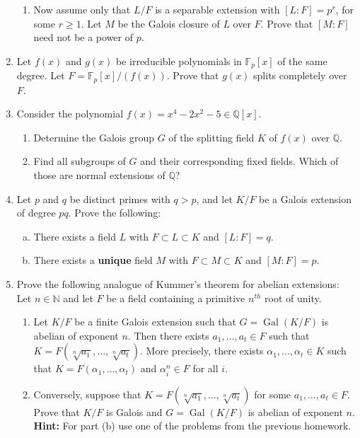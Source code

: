 \documentclass[12pt,
psamsfonts]{amsart}
\theoremstyle{remark}
\theoremstyle{definition}
\newcommand{\N}{\mathbb{N}\xspace}
\newcommand{\Q}{\mathbb{Q}\xspace}
\newcommand{\F}{\mathbb{F}\xspace}
\DeclareMathOperator{\Gal}{Gal}
\numberwithin{equation}{section}
\begin{document}
\begin{enumerate}
\begin{enumerate}
\item Now assume only that $L/F$ is a separable extension with $[L:F]=p^r$, for some $r\geq 1$. Let $M$ be the Galois closure of $L$ over $F$. Prove that $[M:F]$ need not be a power of $p$. 
\end{enumerate} 
\medskip 
\medskip 
\item Let $f(x)$ and $g(x)$ be irreducible polynomials in $\F_p[x]$ of the same degree. Let $F=\F_p[x]/(f(x))$. Prove that $g(x)$ splits completely over $F$. 
\\
\item Consider the polynomial $f(x)=x^4-2x^2-5\in\Q[x]$.
\begin{enumerate}
\item Determine the Galois group $G$ of the splitting field $K$ of $f(x)$ over $\Q$.
\item Find all subgroups of $G$ and their corresponding fixed fields. Which of those are normal extensions of $\Q$?  
\end{enumerate} 
\medskip
\medskip
\item Let $p$ and $q$ be distinct primes with $q>p$, and let $K/F$ be a Galois extension of degree $pq$. Prove the following: 
 \begin{enumerate}
[(a)]\item There exists a field $L$ with $F\subset L\subset K$ and $[L:F]=q$. 
\item There exists a \textbf{unique} field $M$ with $F\subset M\subset K$ and $[M:F]=p$. 
\end{enumerate} 
\medskip
\medskip 
\item Prove the following analogue of Kummer's theorem for abelian extensions: Let $n\in\N$ and let $F$ be a field containing a primitive $n^{th}$ root of unity. 
\begin{enumerate}
\item  Let $K/F$ be a finite Galois extension such that $G=\Gal(K/F)$ is abelian of exponent $n$. Then there exists $a_1,\ldots,a_t\in F$ such that $K=F(\sqrt[n]{a_1},\ldots,\sqrt[n]{a_t})$. More precisely, there exists $\alpha_1,\ldots,\alpha_t\in K$ such that $K=F(\alpha_1,\ldots,\alpha_t)$ and $\alpha_i^n\in F$ for all $i$. 
\item Conversely, suppose that $K=F(\sqrt[n]{a_1},\ldots,\sqrt[n]{a_t})$ for some $a_1,\ldots, a_t\in F$. Prove that $K/F$ is Galois and $G=\Gal(K/F)$ is abelian of exponent $n$. \textbf{Hint:} For part (b) use one of the problems from the previous homework. 
\end{enumerate}

\end{enumerate}
\end{document}
